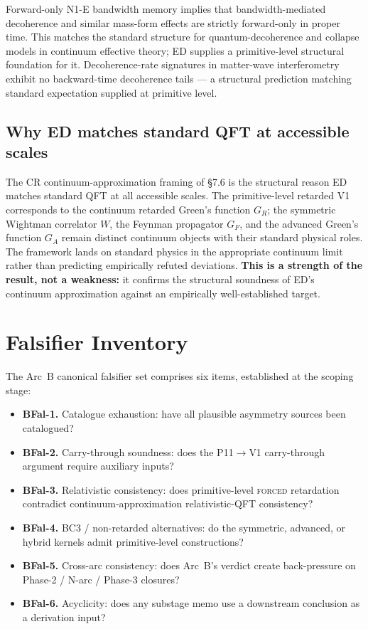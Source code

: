 \documentclass[11pt,a4paper]{article}
\begin{document}
Forward-only N1-E bandwidth memory implies that bandwidth-mediated decoherence and similar mass-form effects are strictly forward-only in proper time. This matches the standard structure for quantum-decoherence and collapse models in continuum effective theory; ED supplies a primitive-level structural foundation for it. Decoherence-rate signatures in matter-wave interferometry exhibit no backward-time decoherence tails --- a structural prediction matching standard expectation supplied at primitive level.

\subsection{Why ED matches standard QFT at accessible scales}

The CR continuum-approximation framing of \S7.6 is the structural reason ED matches standard QFT at all accessible scales. The primitive-level retarded V1 corresponds to the continuum retarded Green's function $G_R$; the symmetric Wightman correlator $W$, the Feynman propagator $G_F$, and the advanced Green's function $G_A$ remain distinct continuum objects with their standard physical roles. The framework lands on standard physics in the appropriate continuum limit rather than predicting empirically refuted deviations. \textbf{This is a strength of the result, not a weakness:} it confirms the structural soundness of ED's continuum approximation against an empirically well-established target.

\section{Falsifier Inventory}

The Arc~B canonical falsifier set comprises six items, established at the scoping stage:
\begin{itemize}[leftmargin=1.5em]
  \item \textbf{BFal-1.} Catalogue exhaustion: have all plausible asymmetry sources been catalogued?
  \item \textbf{BFal-2.} Carry-through soundness: does the P11$\to$V1 carry-through argument require auxiliary inputs?
  \item \textbf{BFal-3.} Relativistic consistency: does primitive-level \textsc{forced} retardation contradict continuum-approximation relativistic-QFT consistency?
  \item \textbf{BFal-4.} BC3 / non-retarded alternatives: do the symmetric, advanced, or hybrid kernels admit primitive-level constructions?
  \item \textbf{BFal-5.} Cross-arc consistency: does Arc~B's verdict create back-pressure on Phase-2 / N-arc / Phase-3 closures?
  \item \textbf{BFal-6.} Acyclicity: does any substage memo use a downstream conclusion as a derivation input?
\end{itemize}
\end{document}
